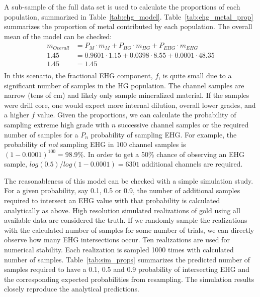 A sub-sample of the full data set is used to calculate the proportions of each population, summarized in Table~\ref{tab:ehg_model}. Table~\ref{tab:ehg_metal_prop} summarizes the proportion of metal contributed by each population. The overall mean of the model can be checked:
\begin{align*}
    m_{Overall} & = P_{M} \cdot m_{M}  + P_{HG} \cdot m_{HG} + P_{EHG} \cdot m_{EHG} \\
    1.45        & = 0.9601 \cdot 1.15 + 0.0398 \cdot 8.55 + 0.0001 \cdot 48.35       \\
    1.45        & = 1.45                                                             \\
\end{align*}
In this scenario, the fractional \gls{EHG} component, $f$, is quite small due to a significant number of samples in the HG population. The channel samples are narrow (tens of cm) and likely only sample mineralized material. If the samples were drill core, one would expect more internal dilution, overall lower grades, and a higher $f$ value. Given the proportions, we can calculate the probability of sampling extreme high grade with $n$ successive channel samples or the required number of samples for a $P_n$ probability of sampling \gls{EHG}. For example, the probability of \emph{not} sampling \gls{EHG} in 100 channel samples is $(1-0.0001)^{100} = 98.9\%$. In order to get a 50\% chance of observing an \gls{EHG} sample, $log(0.5)/log(1-0.0001) = 6301$ additional channels are required.




The reasonableness of this model can be checked with a simple simulation study. For a given probability, say 0.1, 0.5 or 0.9, the number of additional samples required to intersect an \gls{EHG} value with that probability is calculated analytically as above. High resolution simulated realizations of gold using all available data are considered the truth. If we randomly sample the realizations with the calculated number of samples for some number of trials, we can directly observe how many \gls{EHG} intersections occur. Ten realizations are used for numerical stability. Each realization is sampled 1000 times with calculated number of samples. Table~\ref{tab:sim_props} summarizes the predicted number of samples required to have a 0.1, 0.5 and 0.9 probability of intersecting \gls{EHG} and the corresponding expected probabilities from resampling. The simulation results closely reproduce the analytical predictions.

